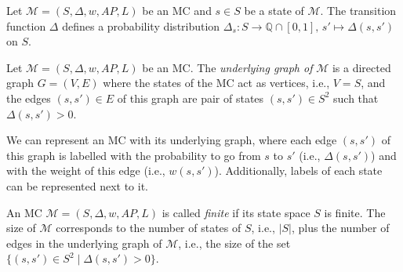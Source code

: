\begin{property}
  Let $\mathcal{M} = (S, \Delta, w, AP, L)$ be an MC and $s \in S$ be a state of $\mathcal{M}$. The transition function $\Delta$ defines a probability distribution $\Delta_s: S \rightarrow \mathbb{Q} \cap [0, 1], \, s' \mapsto \Delta(s, s')$ on $S$.
\end{property}

\begin{definition}
  Let $\mathcal{M}=(S, \Delta, w, AP, L)$ be an MC. The \textit{underlying graph of} $\mathcal{M}$ is a directed graph $G = (V, E)$ where the states of the MC act as vertices, i.e., $V = S$, and the edges $(s, s') \in E$ of this graph are pair of states $(s, s')\in S^2$ such that $\Delta(s, s')>0$.
\end{definition}

We can represent an MC with its underlying graph, where each edge $(s, s')$ of this graph is labelled with the probability to go from $s$ to $s'$ (i.e., $\Delta(s, s')$) and with the weight of this edge (i.e., $w(s, s')$).
Additionally, labels of each
state can be represented next to it.

\begin{notation}
  An MC $\mathcal{M}=(S, \Delta, w, AP, L)$ is called \textit{finite} if its state space $S$ is finite. The size of $\mathcal{M}$ corresponds to the number of states of $S$, i.e., $|S|$, plus
the number of edges in the underlying graph of $\mathcal{M}$, i.e., the size of the set
  $\{(s, s') \in S^2 \; | \; \Delta(s, s') > 0 \}$.
\end{notation}

